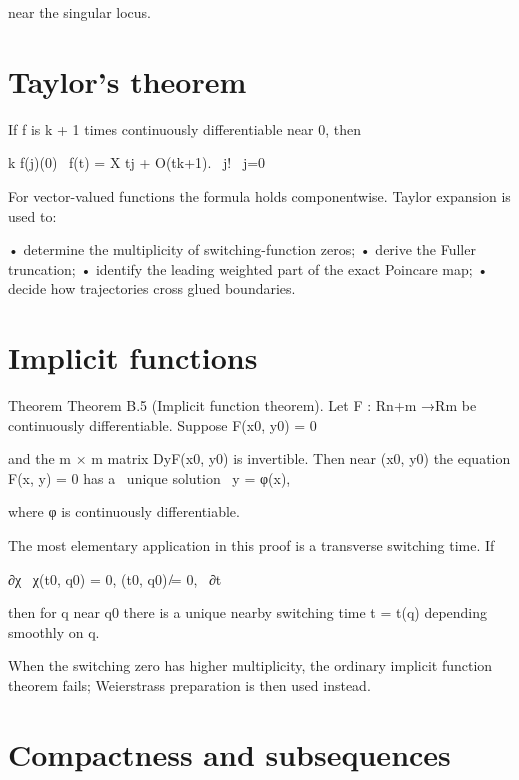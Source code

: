near the singular locus.


\section{Taylor’s theorem}

If f is k + 1 times continuously differentiable near 0, then


\begin{displaytext}
k f(j)(0) \
f(t) = X tj + O(tk+1). \
j! \
j=0
\end{displaytext}

For vector-valued functions the formula holds componentwise. Taylor expansion is used to:


• determine the multiplicity of switching-function zeros; • derive the Fuller truncation; • identify the leading weighted part of the exact Poincare map; • decide how trajectories cross glued boundaries.


\section{Implicit functions}

\begin{statementbox}{Theorem}
Theorem B.5 (Implicit function theorem). Let F : Rn+m →Rm be continuously differentiable. Suppose F(x0, y0) = 0
\end{statementbox}

\begin{displaytext}
and the m × m matrix DyF(x0, y0) is invertible. Then near (x0, y0) the equation F(x, y) = 0 has a \
unique solution \
y = φ(x),
\end{displaytext}

where φ is continuously differentiable.


The most elementary application in this proof is a transverse switching time. If


\begin{displaytext}
∂χ \
χ(t0, q0) = 0, (t0, q0) ̸= 0, \
∂t
\end{displaytext}

then for q near q0 there is a unique nearby switching time t = t(q) depending smoothly on q.


When the switching zero has higher multiplicity, the ordinary implicit function theorem fails; Weierstrass preparation is then used instead.


\section{Compactness and subsequences}

